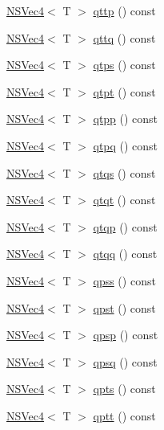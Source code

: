 \begin{DoxyCompactItemize}
\item 
\hyperlink{structNSVec4}{N\-S\-Vec4}$<$ T $>$ \hyperlink{structNSVec4_ae4c82a896567261d1208c78040f1991d}{qttp} () const 
\item 
\hyperlink{structNSVec4}{N\-S\-Vec4}$<$ T $>$ \hyperlink{structNSVec4_afd6d4c6144612c632f25e6c72b12caca}{qttq} () const 
\item 
\hyperlink{structNSVec4}{N\-S\-Vec4}$<$ T $>$ \hyperlink{structNSVec4_ac9a4d921df88c3e837718919ebfa6b59}{qtps} () const 
\item 
\hyperlink{structNSVec4}{N\-S\-Vec4}$<$ T $>$ \hyperlink{structNSVec4_ad2bd40f380902dd3882bb0c56cec1f78}{qtpt} () const 
\item 
\hyperlink{structNSVec4}{N\-S\-Vec4}$<$ T $>$ \hyperlink{structNSVec4_a796e6cadb9546db071f5d760db93883f}{qtpp} () const 
\item 
\hyperlink{structNSVec4}{N\-S\-Vec4}$<$ T $>$ \hyperlink{structNSVec4_a82bb96ef901dabc589bf47a598465592}{qtpq} () const 
\item 
\hyperlink{structNSVec4}{N\-S\-Vec4}$<$ T $>$ \hyperlink{structNSVec4_a0cfa78d21e1175cde35e5fd496ee82f8}{qtqs} () const 
\item 
\hyperlink{structNSVec4}{N\-S\-Vec4}$<$ T $>$ \hyperlink{structNSVec4_abedb30b60bd39343ae6d0eaf9a5f8d05}{qtqt} () const 
\item 
\hyperlink{structNSVec4}{N\-S\-Vec4}$<$ T $>$ \hyperlink{structNSVec4_a9c6d2b5903040037fd0501c4e238d2c3}{qtqp} () const 
\item 
\hyperlink{structNSVec4}{N\-S\-Vec4}$<$ T $>$ \hyperlink{structNSVec4_a658f223c93258d3099c93028dbe63017}{qtqq} () const 
\item 
\hyperlink{structNSVec4}{N\-S\-Vec4}$<$ T $>$ \hyperlink{structNSVec4_ac47848eb104e031b44935028bcbc7776}{qpss} () const 
\item 
\hyperlink{structNSVec4}{N\-S\-Vec4}$<$ T $>$ \hyperlink{structNSVec4_adafe93a258521a76b163567ce01feada}{qpst} () const 
\item 
\hyperlink{structNSVec4}{N\-S\-Vec4}$<$ T $>$ \hyperlink{structNSVec4_a2a866e0803b32363b7f7b3a0febff16e}{qpsp} () const 
\item 
\hyperlink{structNSVec4}{N\-S\-Vec4}$<$ T $>$ \hyperlink{structNSVec4_a6a5aec46b7adce181f17c631b2650216}{qpsq} () const 
\item 
\hyperlink{structNSVec4}{N\-S\-Vec4}$<$ T $>$ \hyperlink{structNSVec4_a6b70a73e753883a7ce1133b8e9563647}{qpts} () const 
\item 
\hyperlink{structNSVec4}{N\-S\-Vec4}$<$ T $>$ \hyperlink{structNSVec4_a252edced5edaccadabeee56f7cda1691}{qptt} () const 

\end{DoxyCompactItemize}
